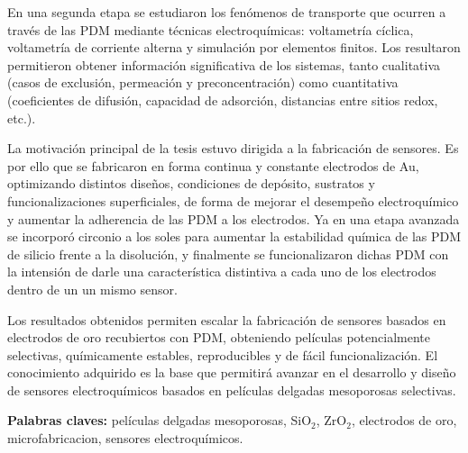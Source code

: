 En una segunda etapa se estudiaron los fenómenos de transporte que ocurren a través de las PDM mediante técnicas electroquímicas: voltametría cíclica, voltametría de corriente alterna y simulación por elementos finitos. Los resultaron permitieron obtener información significativa de los sistemas, tanto cualitativa (casos de exclusión, permeación y preconcentración) como cuantitativa (coeficientes de difusión, capacidad de adsorción, distancias entre sitios redox, etc.).

La motivación principal de la tesis estuvo dirigida a la fabricación de sensores. Es por ello que se fabricaron en forma continua y constante electrodos de Au, optimizando distintos diseños, condiciones de depósito, sustratos y funcionalizaciones superficiales, de forma de mejorar el desempeño electroquímico y aumentar la adherencia de las PDM a los electrodos. Ya en una etapa avanzada se incorporó circonio a los soles para aumentar la estabilidad química de las PDM de silicio frente a la disolución, y finalmente se funcionalizaron dichas PDM con la intensión de darle una característica distintiva a cada uno de los electrodos dentro de un un mismo sensor.

Los resultados obtenidos permiten escalar la fabricación de sensores basados en electrodos de oro recubiertos con PDM, obteniendo películas potencialmente selectivas, químicamente estables, reproducibles y de fácil funcionalización. El conocimiento adquirido es la base que permitirá avanzar en el desarrollo y diseño de sensores electroquímicos basados en películas delgadas mesoporosas selectivas. 
\vspace*{\fill}

\vfill

\noindent\textbf{Palabras claves:} películas delgadas mesoporosas, SiO$_2$, ZrO$_2$, electrodos de oro, microfabricacion, sensores electroquímicos.

\cleardoublepage
